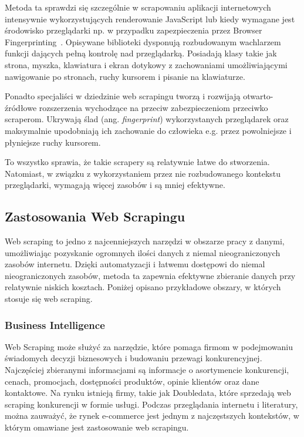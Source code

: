 Metoda ta sprawdzi się szczególnie w scrapowaniu aplikacji internetowych intensywnie wykorzystujących renderowanie JavaScript
lub kiedy wymagane jest środowisko przeglądarki np. w przypadku zapezpieczenia przez Browser Fingerprinting~\cite{apify-headless-browsers}.
Opisywane biblioteki dysponują rozbudowanym wachlarzem funkcji dających pełną kontrolę nad przeglądarką.
Posiadają klasy takie jak strona, myszka, klawiatura i ekran dotykowy z zachowaniami umożliwiającymi nawigowanie po stronach,
ruchy kursorem i pisanie na klawiaturze.

Ponadto specjaliści w dziedzinie web scrapingu tworzą i rozwijają otwarto-źródłowe rozszerzenia wychodzące na przeciw zabezpieczeniom przeciwko scraperom.
Ukrywają ślad (ang. \emph{fingerprint}) wykorzystanych przeglądarek oraz maksymalnie upodobniają ich zachowanie do człowieka e.g. przez powolniejsze i płyniejsze ruchy kursorem.

To wszystko sprawia, że takie scrapery są relatywnie łatwe do stworzenia.
Natomiast, w związku z wykorzystaniem przez nie rozbudowanego kontekstu przeglądarki, wymagają więcej zasobów i są mniej efektywne.

\subsection{Zastosowania Web Scrapingu}\label{subsec:web-scraping-applications}

Web scraping to jedno z najcenniejszych narzędzi w obszarze pracy z danymi, umożliwiając pozyskanie ogromnych ilości danych z niemal nieograniczonych zasobów internetu\cite{Zhao2017}.
Dzięki automatyzacji i łatwemu dostępowi do niemal nieograniczonych zasobów, metoda ta zapewnia efektywne zbieranie danych przy relatywnie niskich kosztach.
Poniżej opisano przykładowe obszary, w których stosuje się web scraping.

\subsubsection{Business Intelligence}
Web Scraping może służyć za narzędzie, które pomaga firmom w podejmowaniu świadomych decyzji biznesowych i budowaniu przewagi konkurencyjnej.
Najczęściej zbieranymi informacjami są informacje o asortymencie konkurencji, cenach, promocjach, dostępności produktów, opinie klientów oraz dane kontaktowe.
Na rynku istnieją firmy, takie jak Doubledata\cite{doubledata}, które sprzedają web scraping konkurencji w formie usługi.
Podczas przeglądania internetu i literatury, można zauważyć, że rynek e-commerce jest jednym z najczęstszych kontekstów, w którym omawiane jest zastosowanie web scrapingu.

